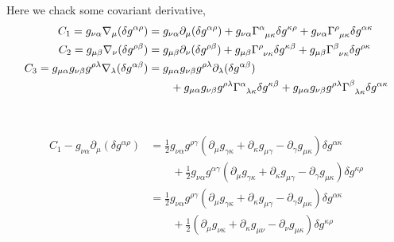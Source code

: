 \documentclass{article}
\theoremstyle{definition}
\def\t{\tensor}
\begin{document}
Here we chack some covariant derivative,
\begin{align}
    C_1 = g_{\nu\alpha} \nabla_\mu (\delta g^{\alpha \rho}) &= g_{\nu\alpha} \partial_\mu (\delta g^{\alpha\rho}) + g_{\nu\alpha}\t{\Gamma}{^\alpha_\mu_\kappa} \delta g^{\kappa \rho} + g_{\nu\alpha}\t{\Gamma}{^\rho_\mu_\kappa} \delta g^{\alpha\kappa}\\
    C_2 = g_{\mu\beta} \nabla_\nu (\delta g^{\rho \beta}) &= g_{\mu\beta} \partial_\nu (\delta g^{\rho\beta}) + g_{\mu\beta} \t{\Gamma}{^\rho_\nu_\kappa} \delta g^{\kappa \beta} + g_{\mu\beta}\t{\Gamma}{^\beta_\nu_\kappa} \delta g^{\rho\kappa}\\
    C_3 = g_{\mu\alpha} g_{\nu\beta} g^{\rho\lambda} \nabla_\lambda (\delta g^{\alpha\beta}) &= g_{\mu\alpha} g_{\nu\beta} g^{\rho\lambda} \partial_\lambda (\delta g^{\alpha\beta} ) \nonumber \\
    & \qquad  + g_{\mu\alpha} g_{\nu\beta} g^{\rho\lambda} \t{\Gamma}{^\alpha_\lambda_\kappa} \delta g^{\kappa \beta} + g_{\mu\alpha} g_{\nu\beta} g^{\rho\lambda} \t{\Gamma}{^\beta_\lambda_\kappa} \delta g^{\alpha \kappa} 
\end{align}

\ 

\begin{align}
    C_1 - g_{\nu\alpha} \partial_\mu (\delta g^{\alpha\rho}) &= \frac{1}{2} g_{\nu\alpha} g^{\rho\gamma} (\partial_\mu g_{\gamma \kappa} + \partial_\kappa g_{\mu \gamma} - \partial_\gamma g_{\mu\kappa} ) \delta g^{\alpha \kappa}
 \nonumber\\
                                                               & \qquad + \frac{1}{2} g_{\nu\alpha} g^{\alpha \gamma} (\partial_\mu g_{\gamma \kappa} + \partial_\kappa g_{\mu \gamma} - \partial_\gamma g_{\mu\kappa}) \delta g^{\kappa\rho} \\
                                                               &= \frac{1}{2} g_{\nu\alpha} g^{\rho\gamma} (\partial_\mu g_{\gamma \kappa} + \partial_\kappa g_{\mu \gamma} - \partial_\gamma g_{\mu\kappa} ) \delta g^{\alpha \kappa}
 \nonumber\\
                                                               & \qquad + \frac{1}{2}  (\partial_\mu g_{\nu \kappa} + \partial_\kappa g_{\mu \nu} - \partial_\nu g_{\mu\kappa}) \delta g^{\kappa\rho}
\end{align}
\end{document}
